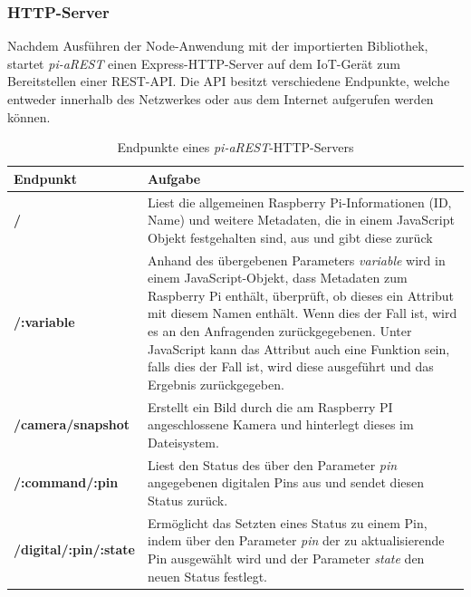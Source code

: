 \subsubsection{HTTP-Server}
Nachdem Ausführen der Node-Anwendung mit der importierten Bibliothek, startet \textit{pi-aREST} einen 
Express-HTTP-Server auf dem IoT-Gerät zum Bereitstellen einer REST-API. Die API besitzt
verschiedene Endpunkte, welche entweder innerhalb des Netzwerkes oder aus dem Internet aufgerufen werden
können.  \cite{piarestgtihub}

\begin{table}[t]
  \centering
  \label{tab:security-threats}
  \begin{tabularx}{\textwidth}{lX}
    \textbf{Endpunkt} & \textbf{Aufgabe}\\
    \hline
    \textbf{/} & Liest die allgemeinen Raspberry Pi-Informationen (ID, Name) und weitere
		    Metadaten, die in einem JavaScript Objekt festgehalten sind, aus und gibt 
		   diese zurück  \\

    \textbf{/:variable} & Anhand des übergebenen Parameters \textit{variable} wird in einem 
				JavaScript-Objekt, dass Metadaten zum Raspberry Pi enthält, überprüft, ob dieses ein
				Attribut mit diesem Namen enthält. Wenn dies der Fall ist, wird es an den
				Anfragenden zurückgegebenen. Unter JavaScript kann das Attribut auch
				eine Funktion sein, falls dies der Fall ist, wird diese ausgeführt und das 
				Ergebnis zurückgegeben. \\

    \textbf{/camera/snapshot} & Erstellt ein Bild durch die am Raspberry PI angeschlossene Kamera 
					     und hinterlegt dieses im Dateisystem.  \\

    \textbf{/:command/:pin} & Liest den Status des über den Parameter \textit{pin} angegebenen digitalen
					Pins aus und sendet diesen Status zurück.   \\

    \textbf{/digital/:pin/:state} & Ermöglicht das Setzten eines Status zu einem Pin, indem über den Parameter 
					\textit{pin} der zu aktualisierende Pin ausgewählt wird und der Parameter
					\textit{state} den neuen Status festlegt.  \\
  \end{tabularx}
  \caption{Endpunkte eines \textit{pi-aREST}-HTTP-Servers \cite{piarestgtihub}}
\end{table}

